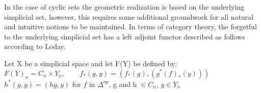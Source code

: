 \documentclass[../../main.tex]{subfiles}
\begin{document}
    In the case of cyclic sets the geometric realization is based on the underlying simplicial set, however, this requires some additional groundwork for all natural and intuitive notions to be maintained. In terms of category theory, the forgetful to the underlying simplicial set has a left adjoint functor described as follows according to Loday. 

    \begin{definition}
        Let X be a simplicial space and let F(Y) be defined by:
        $F(Y)_n=C_n\times Y_n, \qquad f_*(g,y)=(f_*(g), (g^*(f)_*(y)))$
        $h^*(g,y) = (hg,y) $ for $f$ in $\Delta^{op}$, g and h $\in C_n$, $y\in Y_n$
    \end{definition}

    
\end{document}
